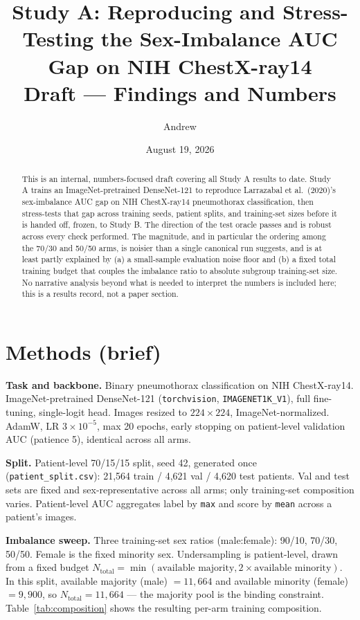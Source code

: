 \documentclass[11pt]{article}
\title{Study A: Reproducing and Stress-Testing the Sex-Imbalance AUC Gap on NIH ChestX-ray14 \\ \large Draft --- Findings and Numbers}
\author{Andrew}
\date{August 19, 2026}
\begin{document}
\maketitle

\begin{abstract}
\noindent This is an internal, numbers-focused draft covering all Study A results to date. Study A trains an ImageNet-pretrained DenseNet-121 to reproduce Larrazabal et al.\ (2020)'s sex-imbalance AUC gap on NIH ChestX-ray14 pneumothorax classification, then stress-tests that gap across training seeds, patient splits, and training-set sizes before it is handed off, frozen, to Study B. The direction of the test oracle passes and is robust across every check performed. The magnitude, and in particular the ordering among the 70/30 and 50/50 arms, is noisier than a single canonical run suggests, and is at least partly explained by (a) a small-sample evaluation noise floor and (b) a fixed total training budget that couples the imbalance ratio to absolute subgroup training-set size. No narrative analysis beyond what is needed to interpret the numbers is included here; this is a results record, not a paper section.
\end{abstract}

\section{Methods (brief)}

\textbf{Task and backbone.} Binary pneumothorax classification on NIH ChestX-ray14. ImageNet-pretrained DenseNet-121 (\texttt{torchvision}, \texttt{IMAGENET1K\_V1}), full fine-tuning, single-logit head. Images resized to $224\times224$, ImageNet-normalized. AdamW, LR $3\times10^{-5}$, max 20 epochs, early stopping on patient-level validation AUC (patience 5), identical across all arms.

\textbf{Split.} Patient-level 70/15/15 split, seed 42, generated once (\texttt{patient\_split.csv}): 21{,}564 train / 4{,}621 val / 4{,}620 test patients. Val and test sets are fixed and sex-representative across all arms; only training-set composition varies. Patient-level AUC aggregates label by \texttt{max} and score by \texttt{mean} across a patient's images.

\textbf{Imbalance sweep.} Three training-set sex ratios (male:female): 90/10, 70/30, 50/50. Female is the fixed minority sex. Undersampling is patient-level, drawn from a fixed budget $N_{\text{total}} = \min(\text{available majority}, 2\times\text{available minority})$. In this split, available majority (male) $=11{,}664$ and available minority (female) $=9{,}900$, so $N_{\text{total}}=11{,}664$ — the majority pool is the binding constraint. Table~\ref{tab:composition} shows the resulting per-arm training composition.
\end{document}
